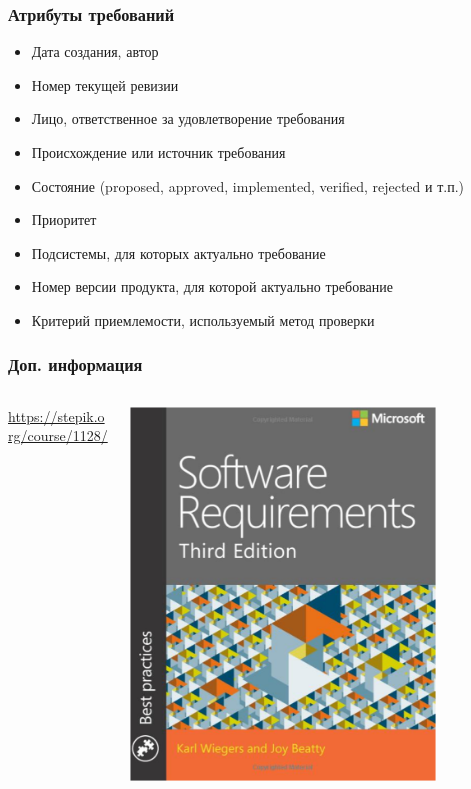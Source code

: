 \documentclass{../../slides-style}
\begin{document}
    \begin{frame}
        \frametitle{Атрибуты требований}
        \begin{itemize}
            \item Дата создания, автор
            \item Номер текущей ревизии
            \item Лицо, ответственное за удовлетворение требования
            \item Происхождение или источник требования
            \item Состояние (proposed, approved, implemented, verified, rejected и т.п.)
            \item Приоритет
            \item Подсистемы, для которых актуально требование
            \item Номер версии продукта, для которой актуально требование
            \item Критерий приемлемости, используемый метод проверки
        \end{itemize}
    \end{frame}

    \begin{frame}
        \frametitle{Доп. информация}
        \begin{columns}
            \begin{column}{0.5\textwidth}
                \url{https://stepik.org/course/1128/}
            \end{column}
            \begin{column}{0.5\textwidth}
                \strut
                \includegraphics[width=0.8\textwidth]{bookCover.png}
            \end{column}
        \end{columns}
    \end{frame}
\end{document}
